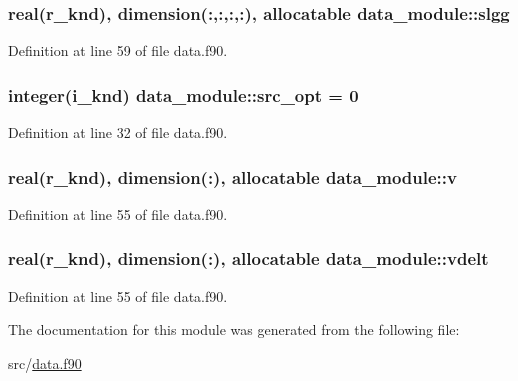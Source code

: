 \hypertarget{classdata__module_a28dc2858f4b2054a06645430e7292d2a}{
\subsubsection[{slgg}]{\setlength{\rightskip}{0pt plus 5cm}real(r\-\_\-knd), dimension(\-:,\-:,\-:,\-:), allocatable data\-\_\-module\-::slgg}}\label{classdata__module_a28dc2858f4b2054a06645430e7292d2a}


Definition at line 59 of file data.\-f90.

\hypertarget{classdata__module_aa630a65ce606a2869f55b214eeb6d9ec}{
\subsubsection[{src\-\_\-opt}]{\setlength{\rightskip}{0pt plus 5cm}integer(i\-\_\-knd) data\-\_\-module\-::src\-\_\-opt = 0}}\label{classdata__module_aa630a65ce606a2869f55b214eeb6d9ec}


Definition at line 32 of file data.\-f90.

\hypertarget{classdata__module_a61d334d68509b4d5fac687707ac83241}{
\subsubsection[{v}]{\setlength{\rightskip}{0pt plus 5cm}real(r\-\_\-knd), dimension(\-:), allocatable data\-\_\-module\-::v}}\label{classdata__module_a61d334d68509b4d5fac687707ac83241}


Definition at line 55 of file data.\-f90.

\hypertarget{classdata__module_a8df0533fb95046e281a489f1c5dc9030}{
\subsubsection[{vdelt}]{\setlength{\rightskip}{0pt plus 5cm}real(r\-\_\-knd), dimension(\-:), allocatable data\-\_\-module\-::vdelt}}\label{classdata__module_a8df0533fb95046e281a489f1c5dc9030}


Definition at line 55 of file data.\-f90.



The documentation for this module was generated from the following file\-:\begin{DoxyCompactItemize}
\item 
src/\hyperlink{data_8f90}{data.\-f90}\end{DoxyCompactItemize}
